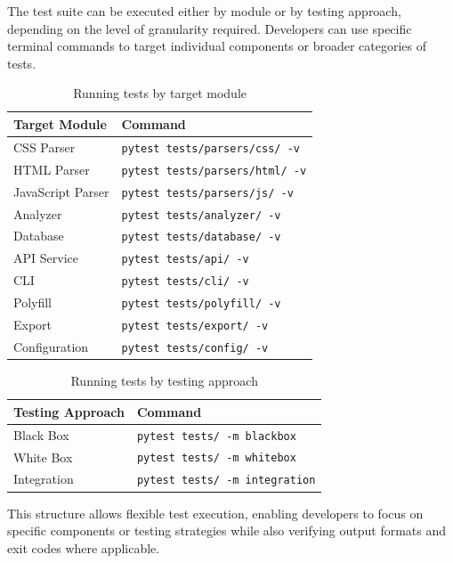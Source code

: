 The test suite can be executed either by module or by testing approach, depending on the level of granularity required. Developers can use specific terminal commands to target individual components or broader categories of tests.

\begin{table}[H]
    \centering
    \begin{tabular}{|l|l|}
        \hline
        \textbf{Target Module} & \textbf{Command} \\
        \hline \hline
        CSS Parser & \texttt{pytest tests/parsers/css/ -v} \\ \hline
        HTML Parser & \texttt{pytest tests/parsers/html/ -v} \\ \hline
        JavaScript Parser & \texttt{pytest tests/parsers/js/ -v} \\ \hline
        Analyzer & \texttt{pytest tests/analyzer/ -v} \\ \hline
        Database & \texttt{pytest tests/database/ -v} \\ \hline
        API Service & \texttt{pytest tests/api/ -v} \\ \hline
        CLI & \texttt{pytest tests/cli/ -v} \\ \hline
        Polyfill & \texttt{pytest tests/polyfill/ -v} \\ \hline
        Export & \texttt{pytest tests/export/ -v} \\ \hline
        Configuration & \texttt{pytest tests/config/ -v} \\ \hline
    \end{tabular}
    \caption{Running tests by target module}
    \label{tab:test-by-module}
\end{table}

\begin{table}[H]
    \centering
    \begin{tabular}{|l|l|}
        \hline
        \textbf{Testing Approach} & \textbf{Command} \\
        \hline \hline
        Black Box   & \texttt{pytest tests/ -m blackbox} \\ \hline
        White Box   & \texttt{pytest tests/ -m whitebox} \\ \hline
        Integration & \texttt{pytest tests/ -m integration} \\ \hline
    \end{tabular}
    \caption{Running tests by testing approach}
    \label{tab:test-by-approach}
\end{table}

This structure allows flexible test execution, enabling developers to focus on specific components or testing strategies while also verifying output formats and exit codes where applicable.
